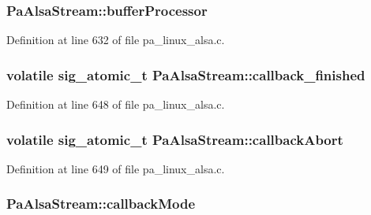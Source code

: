 \subsubsection[{\texorpdfstring{buffer\+Processor}{bufferProcessor}}]{ Pa\+Alsa\+Stream\+::buffer\+Processor}\hypertarget{struct_pa_alsa_stream_acd44698cd6e3508f0d41c877ba5b436a}{}\label{struct_pa_alsa_stream_acd44698cd6e3508f0d41c877ba5b436a}


Definition at line 632 of file pa\+\_\+linux\+\_\+alsa.\+c.

\subsubsection[{\texorpdfstring{callback\+\_\+finished}{callback_finished}}]{\setlength{\rightskip}{0pt plus 5cm}volatile sig\+\_\+atomic\+\_\+t Pa\+Alsa\+Stream\+::callback\+\_\+finished}\hypertarget{struct_pa_alsa_stream_a118a04f7270ac45c669d5cec7a410119}{}\label{struct_pa_alsa_stream_a118a04f7270ac45c669d5cec7a410119}


Definition at line 648 of file pa\+\_\+linux\+\_\+alsa.\+c.

\subsubsection[{\texorpdfstring{callback\+Abort}{callbackAbort}}]{\setlength{\rightskip}{0pt plus 5cm}volatile sig\+\_\+atomic\+\_\+t Pa\+Alsa\+Stream\+::callback\+Abort}\hypertarget{struct_pa_alsa_stream_ab572de6c0a951967b3a47713427858d3}{}\label{struct_pa_alsa_stream_ab572de6c0a951967b3a47713427858d3}


Definition at line 649 of file pa\+\_\+linux\+\_\+alsa.\+c.

\subsubsection[{\texorpdfstring{callback\+Mode}{callbackMode}}]{ Pa\+Alsa\+Stream\+::callback\+Mode}\hypertarget{struct_pa_alsa_stream_ad122ee597668cb143bc79be9712f382e}{}\label{struct_pa_alsa_stream_ad122ee597668cb143bc79be9712f382e}


